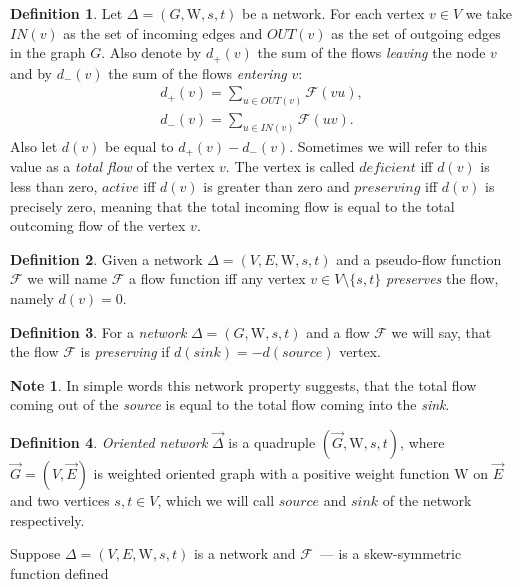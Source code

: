 \documentclass[12pt]{article}
\theoremstyle{definition}
\newtheorem*{note}{Note}
\newtheorem{definition}{Definition}
\newcommand{\wt}{\mathrm{W}}
\newcommand{\flow}{\mathcal{F}}
\newcommand{\source}{\mathit{source}}
\newcommand{\sink}{\mathit{sink}}
\newcommand{\net}{\Delta}
\newcommand{\onet}{\vec{\Delta}}
\numberwithin{remark}{section}
\numberwithin{theorem}{section}
\numberwithin{prop}{section}
\numberwithin{equation}{section}
\numberwithin{lemma}{section}
\numberwithin{prop_under_lemma}{lemma}
\begin{document}
    \begin{definition}
      Let $\net = (G, \wt, s, t)$ be a network.
      For each vertex $v \in V$ we take $IN(v)$ as the set of incoming edges
      and $OUT(v)$ as the set of outgoing edges in the graph $G$.
      Also denote by $d_{+}(v)$ the sum of the flows \textit{leaving} the node $v$ and by
      $d_{-}(v)$ the sum of the flows \textit{entering} $v$:
      \begin{align*}
          d_{+}(v) = \sum_{u \in OUT(v)} \flow(vu),\\
          d_{-}(v) = \sum_{u \in IN(v)} \flow(uv).
      \end{align*}
      Also let $d(v)$ be equal to $d_{+}(v) - d_{-}(v)$. Sometimes we will refer to this value as
      a \textit{total flow} of the vertex $v$.
      The vertex is called $deficient$ iff $d(v)$ is less than zero,
      $active$ iff $d(v)$ is greater than zero and
      $preserving$ iff $d(v)$ is precisely zero, meaning that the total incoming flow
      is equal to the total outcoming flow of the vertex $v$.
    \end{definition}
    \begin{definition}
      Given a network $\net = (V, E, \wt, s, t)$ and a pseudo-flow function $\flow$ we will name $\flow$ a flow function iff 
      any vertex $v \in V \setminus \{s,t\}$ \textit{preserves} the flow, namely $d(v) = 0$.
    \end{definition}
    \begin{definition}
      For a \textit{network} $\net = (G, \wt, s, t)$ and a flow $\flow$ we will say,
      that the flow $\flow$ is \textit{preserving} if $d(\mathit{sink}) = -d(\mathit{source})$ vertex.
    \end{definition}
    \begin{note}
      In simple words this network property suggests, 
      that the total flow coming out of the \textit{source} is equal to the total flow
      coming into the \textit{sink}.
    \end{note}
    \begin{definition}
        \textit{Oriented network} $\onet$ is a quadruple $(\vec{G}, \wt, s, t)$, where
        $\vec{G} = (V, \vec{E})$ is weighted oriented graph 
        with a positive weight function $\wt$ on $\vec{E}$ and two vertices $s, t \in V$, which
        we will call $\source$ and $\sink$ of the network respectively.
    \end{definition}
    Suppose $\net = (V, E, \wt, s, t)$ is a network and $\flow$~--- is a skew-symmetric function defined
\end{document}
